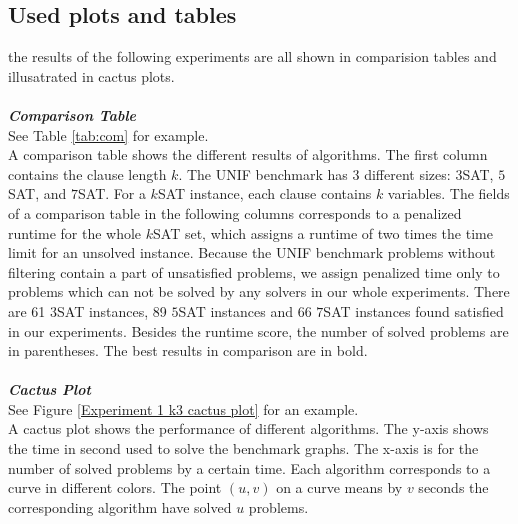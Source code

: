 \documentclass[12pt,a4paper,twoside]{scrartcl}
\numberwithin{equation}{section}
\begin{document}
\subsection{Used plots and tables}
the results of the following experiments are all shown in comparision tables and  illusatrated in cactus plots.  \\
\\
\emph{\textbf{Comparison Table}}\\
See Table \ref{tab:com} for example.\\
A comparison table shows the different results of algorithms. The first column contains the
clause length $k$. The UNIF benchmark has $3$ different sizes: $3$SAT, $5$SAT, and $7$SAT. For a $k$SAT instance, each clause contains $k$ variables. The fields of a comparison table in the following columns corresponds to a penalized runtime for the whole $k$SAT set, which assigns a runtime of two times the time limit for an unsolved instance. Because the UNIF benchmark problems without filtering contain a part of unsatisfied problems, we assign penalized time only to problems which can not be solved by any solvers in our whole experiments. There are 61 $3$SAT instances, 89 $5$SAT instances and 66 $7$SAT instances found satisfied in our experiments. Besides the runtime score, the number of solved problems are in parentheses. The best results in comparison are in bold.
\\
\\
\emph{\textbf{Cactus Plot}}\\
See Figure \ref{Experiment 1 k3 cactus plot} for an example.\\
A cactus plot shows the performance of different algorithms. The y-axis shows the time in second used to solve the benchmark graphs.  The x-axis is for the number of solved problems by a certain time. Each algorithm corresponds to a curve in different colors. The point $(u, v)$ on a curve means by $v$ seconds the corresponding algorithm have solved  $u$ problems.  \\
\end{document}
